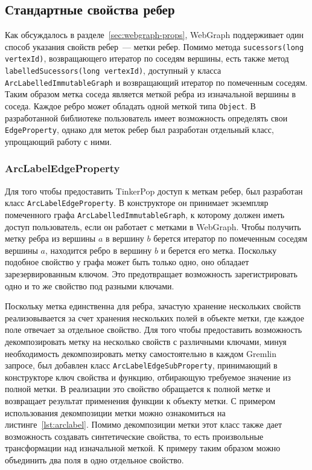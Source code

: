 \documentclass[times,specification,annotation]{itmo-student-thesis}
\begin{document}
\subsection{Стандартные свойства ребер}

Как обсуждалось в разделе~\ref{sec:webgraph-props}, WebGraph поддерживает один способ указания свойств ребер~--- метки ребер. Помимо метода \texttt{sucessors(long vertexId)}, возвращающего итератор по соседям вершины, есть также метод \texttt{labelledSucessors(long vertexId)}, доступный у класса \texttt{ArcLabelledImmutableGraph} и возвращающий итератор по помеченным соседям. Таким образом метка соседа является меткой ребра из изначальной вершины в соседа. Каждое ребро может обладать одной меткой типа \texttt{Object}. В разработанной библиотеке пользователь имеет возможность определять свои \texttt{EdgeProperty}, однако для меток ребер был разработан отдельный класс, упрощающий работу с ними.

\subsubsection{ArcLabelEdgeProperty}

Для того чтобы предоставить TinkerPop доступ к меткам ребер, был разработан класс \texttt{ArcLabelEdgeProperty}. В конструкторе он принимает экземпляр помеченного графа \texttt{ArcLabelledImmutableGraph}, к которому должен иметь доступ пользователь, если он работает с метками в WebGraph. Чтобы получить метку ребра из вершины $a$ в вершину $b$ берется итератор по помеченным соседям вершины $a$, находится ребро в вершину $b$ и берется его метка. Поскольку подобное свойство у графа может быть только одно, оно обладает зарезервированным ключом. Это предотвращает возможность зарегистрировать одно и то же свойство под разными ключами.

Поскольку метка единственна для ребра, зачастую хранение нескольких свойств реализовывается за счет хранения нескольких полей в объекте метки, где каждое поле отвечает за отдельное свойство. Для того чтобы предоставить возможность декомпозировать метку на несколько свойств с различными ключами, минуя необходимость декомпозировать метку самостоятельно в каждом Gremlin запросе, был добавлен класс \texttt{ArcLabelEdgeSubProperty}, принимающий в конструкторе ключ свойства и функцию, отбирающую требуемое значение из полной метки. В реализации это свойство обращается к полной метке и возвращает результат применения функции к объекту метки. С примером использования декомпозиции метки можно ознакомиться на листинге~\ref{lst:arclabel}. Помимо декомпозиции метки этот класс также дает возможность создавать синтетические свойства, то есть произвольные трансформации над изначальной меткой. К примеру таким образом можно объединить два поля в одно отдельное свойство.
\end{document}
